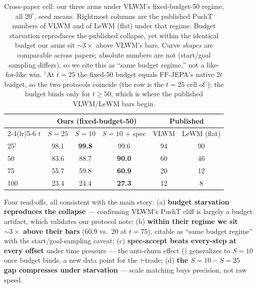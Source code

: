 \documentclass{article}
\newcommand{\ours}[1]{\textbf{#1}}          %
\newcommand{\degc}[1]{$#1^\circ$}
\begin{document}
\begin{table}[h]
\centering
\caption{Cross-paper cell: our three arms under VLWM's fixed-budget-50 regime, all
\degc{20}, seed means. Rightmost columns are the published PushT numbers of VLWM and of
LeWM (flat) under that regime. Budget starvation reproduces the published collapse, yet
within the identical budget our arms sit ${\sim}3\times$ above VLWM's bars. Curve
\emph{shapes} are comparable across papers; absolute numbers are not (start/goal sampling
differs), so we cite this as ``same budget regime,'' not a like-for-like win.
$^{\dagger}$At $t{=}25$ the fixed-50 budget equals FF-JEPA's native $2t$ budget, so the two
protocols coincide (the row is the $t{=}25$ cell of ); the budget binds
only for $t\geq50$, which is where the published VLWM/LeWM bars begin.}
\label{tab:vlwm}
\begin{tabular}{lccc cc}
\toprule
& \multicolumn{3}{c}{Ours (fixed-budget-50)} & \multicolumn{2}{c}{Published} \\
\cmidrule(lr){2-4}\cmidrule(lr){5-6}
$t$ & $S{=}25$ & $S{=}10$ & $S{=}10$ $+$ spec & VLWM & LeWM (flat) \\
\midrule
25$^{\dagger}$ & 98.1 & \ours{99.8} & 99.6 & 94 & 90 \\
50  & 83.6 & 88.7 & \ours{90.0} & 60 & 46 \\
75  & 55.7 & 59.8 & \ours{60.9} & 20 & 12 \\
100 & 23.4 & 24.4 & \ours{27.3} & 12 & 8  \\
\bottomrule
\end{tabular}
\end{table}

Four read-offs, all consistent with the main story: (a) \textbf{budget starvation
reproduces the collapse} --- confirming VLWM's PushT cliff is largely a budget artifact,
which validates our protocol note; (b) \textbf{within their regime we sit ${\sim}3\times$
above their bars} ($60.9$ vs.\ $20$ at $t{=}75$), citable as ``same budget regime'' with
the start/goal-sampling caveat; (c) \textbf{spec-accept beats every-step at every offset}
under time pressure --- the anti-churn effect () generalizes to $S{=}10$
once budget binds, a new data point for the $\tau$-trade; (d) \textbf{the $S{=}10{-}S{=}25$
gap compresses under starvation} --- scale matching buys precision, not raw speed.
\end{document}
